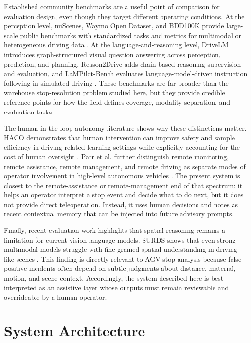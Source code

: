 \documentclass[conference]{IEEEtran}
\begin{document}
Established community benchmarks are a useful point of comparison for evaluation design, even though they target different operating conditions. At the perception level, nuScenes, Waymo Open Dataset, and BDD100K provide large-scale public benchmarks with standardized tasks and metrics for multimodal or heterogeneous driving data \cite{caesar2020nuscenes,sun2020waymo,yu2020bdd100k}. At the language-and-reasoning level, DriveLM introduces graph-structured visual question answering across perception, prediction, and planning, Reason2Drive adds chain-based reasoning supervision and evaluation, and LaMPilot-Bench evaluates language-model-driven instruction following in simulated driving \cite{sima2024drivelm,nie2024reason2drive,ma2024lampilot}. These benchmarks are far broader than the warehouse stop-resolution problem studied here, but they provide credible reference points for how the field defines coverage, modality separation, and evaluation tasks.

The human-in-the-loop autonomy literature shows why these distinctions matter. HACO demonstrates that human intervention can improve safety and sample efficiency in driving-related learning settings while explicitly accounting for the cost of human oversight \cite{li2022haco}. Parr et al. further distinguish remote monitoring, remote assistance, remote management, and remote driving as separate modes of operator involvement in high-level autonomous vehicles \cite{parr2024remote}. The present system is closest to the remote-assistance or remote-management end of that spectrum: it helps an operator interpret a stop event and decide what to do next, but it does not provide direct teleoperation. Instead, it uses human decisions and notes as recent contextual memory that can be injected into future advisory prompts.

Finally, recent evaluation work highlights that spatial reasoning remains a limitation for current vision-language models. SURDS shows that even strong multimodal models struggle with fine-grained spatial understanding in driving-like scenes \cite{guo2024surds}. This finding is directly relevant to AGV stop analysis because false-positive incidents often depend on subtle judgments about distance, material, motion, and scene context. Accordingly, the system described here is best interpreted as an assistive layer whose outputs must remain reviewable and overrideable by a human operator.

\section{System Architecture}
\end{document}

